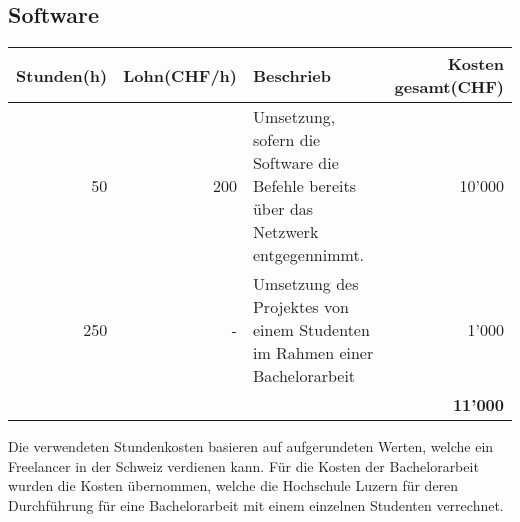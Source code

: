 \subsection{Software}
\begin{tabularx}{\textwidth}{|r|r|X|r|}
	\hline
	\textbf{Stunden(h)} & \textbf{Lohn(CHF/h)} & \textbf{Beschrieb} & \textbf{Kosten gesamt(CHF)} \\
	\hline
	50 & 200 & Umsetzung, sofern die Software die Befehle bereits über das Netzwerk entgegennimmt. & 10'000 \\
	\hline
	250 & - & Umsetzung des Projektes von einem Studenten im Rahmen einer Bachelorarbeit & 1'000 \\
	& & & \textbf{11'000} \\
	\hline
\end{tabularx}

Die verwendeten Stundenkosten basieren auf aufgerundeten Werten, welche ein Freelancer in der Schweiz verdienen kann.
Für die Kosten der Bachelorarbeit wurden die Kosten übernommen, welche die Hochschule Luzern für deren Durchführung für eine Bachelorarbeit mit einem einzelnen Studenten verrechnet.
